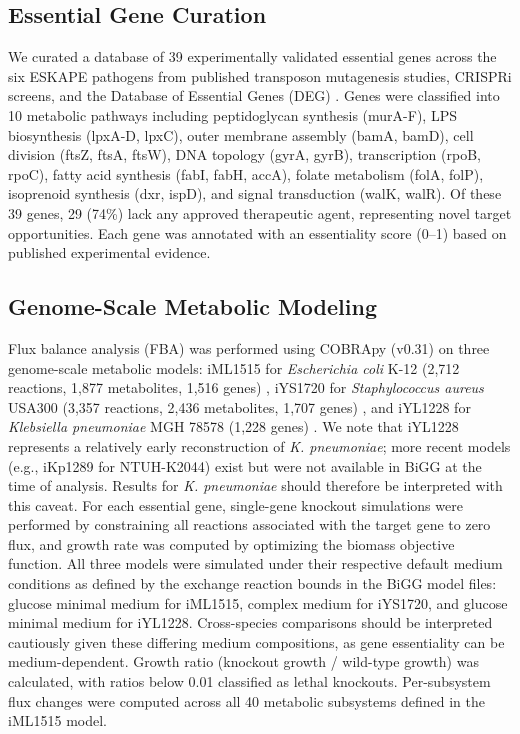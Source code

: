 \documentclass[12pt,a4paper]{article}
\begin{document}
\subsection{Essential Gene Curation}
We curated a database of 39 experimentally validated essential genes across the six ESKAPE pathogens from published transposon mutagenesis studies, CRISPRi screens, and the Database of Essential Genes (DEG) \citep{luo2014}. Genes were classified into 10 metabolic pathways including peptidoglycan synthesis (murA-F), LPS biosynthesis (lpxA-D, lpxC), outer membrane assembly (bamA, bamD), cell division (ftsZ, ftsA, ftsW), DNA topology (gyrA, gyrB), transcription (rpoB, rpoC), fatty acid synthesis (fabI, fabH, accA), folate metabolism (folA, folP), isoprenoid synthesis (dxr, ispD), and signal transduction (walK, walR). Of these 39 genes, 29 (74\%) lack any approved therapeutic agent, representing novel target opportunities. Each gene was annotated with an essentiality score (0--1) based on published experimental evidence.

\subsection{Genome-Scale Metabolic Modeling}
Flux balance analysis (FBA) was performed using COBRApy (v0.31) \citep{ebrahim2013} on three genome-scale metabolic models: iML1515 for \textit{Escherichia coli} K-12 (2,712 reactions, 1,877 metabolites, 1,516 genes) \citep{monk2017}, iYS1720 for \textit{Staphylococcus aureus} USA300 (3,357 reactions, 2,436 metabolites, 1,707 genes) \citep{seif2018}, and iYL1228 for \textit{Klebsiella pneumoniae} MGH 78578 (1,228 genes) \citep{liao2011}. We note that iYL1228 represents a relatively early reconstruction of \textit{K. pneumoniae}; more recent models (e.g., iKp1289 for NTUH-K2044) exist but were not available in BiGG at the time of analysis. Results for \textit{K. pneumoniae} should therefore be interpreted with this caveat. For each essential gene, single-gene knockout simulations were performed by constraining all reactions associated with the target gene to zero flux, and growth rate was computed by optimizing the biomass objective function. All three models were simulated under their respective default medium conditions as defined by the exchange reaction bounds in the BiGG model files: glucose minimal medium for iML1515, complex medium for iYS1720, and glucose minimal medium for iYL1228. Cross-species comparisons should be interpreted cautiously given these differing medium compositions, as gene essentiality can be medium-dependent. Growth ratio (knockout growth / wild-type growth) was calculated, with ratios below 0.01 classified as lethal knockouts. Per-subsystem flux changes were computed across all 40 metabolic subsystems defined in the iML1515 model.
\end{document}

